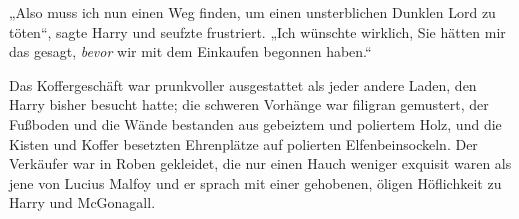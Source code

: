 „Also muss ich nun einen Weg finden, um einen unsterblichen Dunklen Lord zu töten“, sagte Harry und seufzte frustriert. „Ich wünschte wirklich, Sie hätten mir das gesagt, \emph{bevor} wir mit dem Einkaufen begonnen haben.“

\later

Das Koffergeschäft war prunkvoller ausgestattet als jeder andere Laden, den Harry bisher besucht hatte; die schweren Vorhänge war filigran gemustert, der Fußboden und die Wände bestanden aus gebeiztem und poliertem Holz, und die Kisten und Koffer besetzten Ehrenplätze auf polierten Elfenbeinsockeln. Der Verkäufer war in Roben gekleidet, die nur einen Hauch weniger exquisit waren als jene von Lucius Malfoy und er sprach mit einer gehobenen, öligen Höflichkeit zu Harry und McGonagall.

